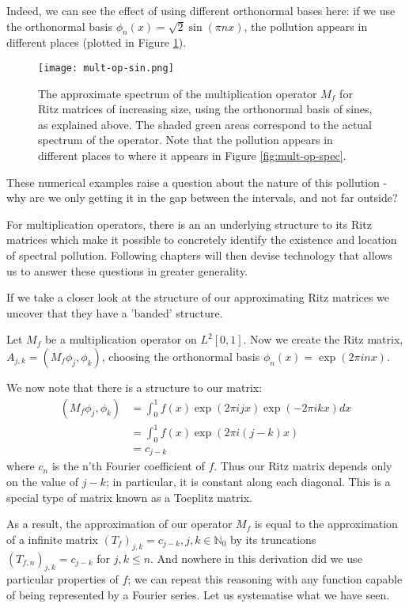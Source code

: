 \documentclass[../main.tex]{subfiles}
\begin{document}
Indeed, we can see the effect of using different orthonormal bases here: if we
use the orthonormal basis $\phi_n(x) = {\sqrt{2}}\sin(\pi nx)$, the
pollution appears in different places (plotted in Figure \ref{fig:mult-op-sin}).

\begin{figure}[h]
\centering
\texttt{[image: mult-op-sin.png]}
\caption{The approximate spectrum of the multiplication operator $M_f$ for Ritz
	matrices of increasing size, using the orthonormal basis of sines,
  as explained above.
  The shaded green areas correspond to the
	actual spectrum of the operator. Note that the pollution appears in different
  places to where it appears in Figure \ref{fig:mult-op-spec}.}
\label{fig:mult-op-sin}	
\end{figure}

These numerical examples raise a question about the nature of this
pollution - why are we only getting it in the gap between the intervals, and not
far outside?

For multiplication operators, there is an
an underlying structure to its Ritz matrices which
make it possible to concretely identify the existence and location of spectral
pollution. Following chapters will then devise technology that allows us to 
answer these questions in greater generality.

If we take a closer look at the structure of our approximating Ritz matrices we
uncover that they have a 'banded' structure.
\begin{example}\label{exp:mult-op-toeplitz}
Let $M_f$ be a multiplication operator on $L^2[0, 1]$. Now we create the Ritz
matrix, $A_{j,k} = (M_f \phi_j, \phi_k)$, choosing the orthonormal basis
$\phi_n(x) = \exp(2 \pi i n x).$

We now note that there is a structure to our matrix:
\begin{align*}
(M_f \phi_j, \phi_k) & = \int_0^1 f(x) \exp(2 \pi i j x) \exp(-2 \pi i k x) dx \\
& = \int_0^1 f(x) \exp(2 \pi i (j-k) x)\\
& = c_{j-k}
\end{align*}
where $c_n$ is the n'th Fourier coefficient of $f$. Thus our Ritz matrix depends only
on the value of $j-k$; in particular, it is constant along each
diagonal. This is a special type of matrix known as a Toeplitz matrix.
\end{example}
As a result, the approximation of our operator $M_f$ is equal to the
approximation of a infinite matrix $(T_f)_{j,k} = c_{j-k}, j,k \in \mathbb{N}_0$
by its truncations $(T_{f,n})_{j,k} = c_{j-k}$ for $j, k \leq n$. And nowhere in
this derivation did we use particular
properties of $f$; we can repeat this reasoning with any function capable of
being represented by a Fourier series. Let us systematise what we have seen.
\end{document}
